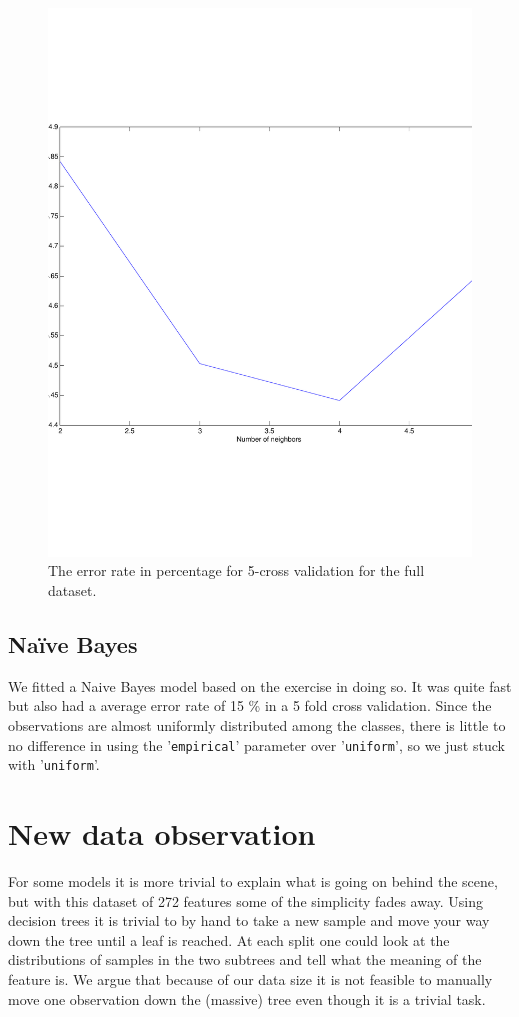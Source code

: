 \begin{figure}[H]
\centering
\includegraphics[width=0.6\linewidth, trim= 0mm 30mm 0mm 30mm, clip]{code/5fold_knn_60000samples}
\caption{The error rate in percentage for 5-cross validation for the full dataset.\label{fig:knn_large}}
\end{figure}



\subsection{Naïve Bayes}
We fitted a Naive Bayes model based on the exercise in doing so. It was quite fast but also had a average error rate of 15 \% in a 5 fold cross validation. Since the observations are almost uniformly distributed among the classes, there is little to no difference in using the '\texttt{empirical}' parameter over '\texttt{uniform}', so we just stuck with '\texttt{uniform}'.


\section{New data observation}
For some models it is more trivial to explain what is going on behind the scene, but with this dataset of 272 features some of the simplicity fades away. Using decision trees it is trivial to by hand to take a new sample and move your way down the tree until a leaf is reached. At each split one could look at the distributions of samples in the two subtrees and tell what the meaning of the feature is. We argue that because of our data size it is not feasible to manually move one observation down the (massive) tree even though it is a trivial task. 

